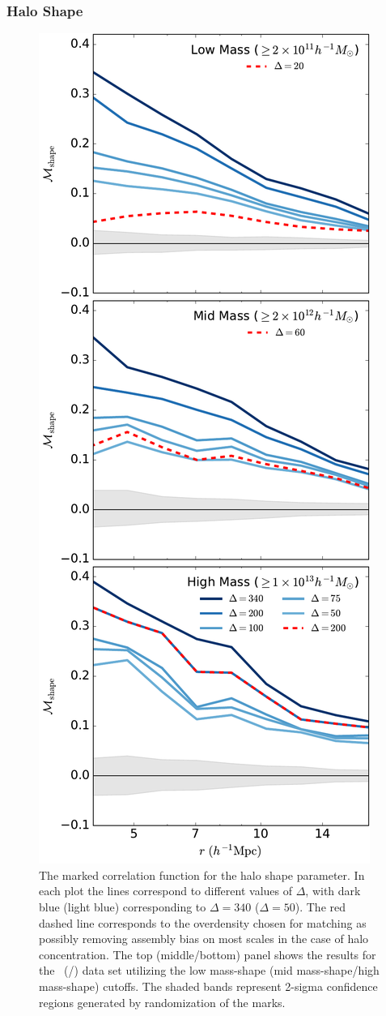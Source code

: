 \documentclass[usenatbib,fleqn]{mnras}
\begin{document}
\subsubsection{Halo Shape}

\begin{figure}
	\centering
	\includegraphics[width=.4\textwidth]{all_mcf_shape.pdf}
	\caption{
The marked correlation function for the halo shape parameter. In each plot the lines correspond to different values of $\Delta$, with dark blue (light blue) corresponding to $\Delta = 340$ ($\Delta = 50$). The red dashed line corresponds to the overdensity chosen for matching as possibly removing assembly bias on most scales in the case of halo concentration. The top (middle/bottom) panel shows the results for the
\simA \ (\simB /\simC) data set utilizing the low mass-shape (mid mass-shape/high mass-shape) cutoffs. The shaded bands represent 2-sigma confidence regions generated by randomization of the marks.
}
	\label{fig:cc_mcf_s}
\end{figure}
\end{document}
